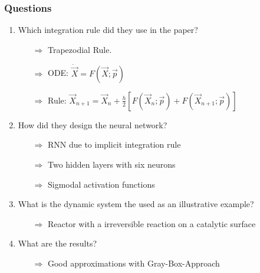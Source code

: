 \begin{frame}
	\frametitle{Questions}
	\begin{enumerate}
		\item Which integration rule did they use in the paper?
		\begin{itemize}
			\item[$\Rightarrow$] Trapezodial Rule.\vspace{1mm}
			\item[$\Rightarrow$] ODE: $\dot{\overrightarrow{X}} = F(\overrightarrow{X}; \overrightarrow{p})$\vspace{1mm}
			\item[$\Rightarrow$] Rule: $\overrightarrow{X}_{n+1} = \overrightarrow{X}_n + \frac{h}{2}[F(\overrightarrow{X}_n; \overrightarrow{p}) + F(\overrightarrow{X}_{n+1}; \overrightarrow{p})]$
		\end{itemize}
		\item How did they design the neural network?
		\begin{itemize}
			\item[$\Rightarrow$] RNN due to implicit integration rule
			\item[$\Rightarrow$] Two hidden layers with six neurons
			\item[$\Rightarrow$] Sigmodal activation functions
		\end{itemize}
		\item What is the dynamic system the used as an illustrative example?
		\begin{itemize}
			\item[$\Rightarrow$] Reactor with a irreversible reaction on a catalytic surface
		\end{itemize}
		\item What are the results?
		\begin{itemize}
			\item[$\Rightarrow$] Good approximations with Gray-Box-Approach
		\end{itemize}
	\end{enumerate}
\end{frame}
